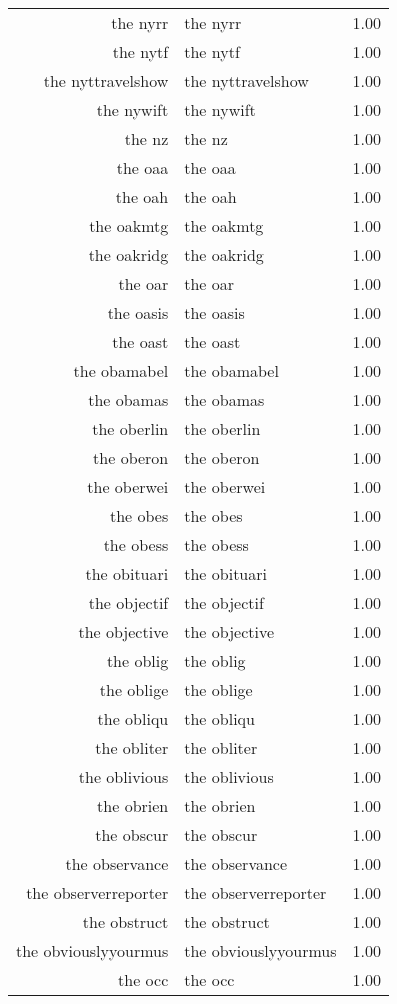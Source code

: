 \begin{table}[ht]
\begin{tabular}{rlr}
  the nyrr & the nyrr & 1.00 \\ 
  the nytf & the nytf & 1.00 \\ 
  the nyttravelshow & the nyttravelshow & 1.00 \\ 
  the nywift & the nywift & 1.00 \\ 
  the nz & the nz & 1.00 \\ 
  the oaa & the oaa & 1.00 \\ 
  the oah & the oah & 1.00 \\ 
  the oakmtg & the oakmtg & 1.00 \\ 
  the oakridg & the oakridg & 1.00 \\ 
  the oar & the oar & 1.00 \\ 
  the oasis & the oasis & 1.00 \\ 
  the oast & the oast & 1.00 \\ 
  the obamabel & the obamabel & 1.00 \\ 
  the obamas & the obamas & 1.00 \\ 
  the oberlin & the oberlin & 1.00 \\ 
  the oberon & the oberon & 1.00 \\ 
  the oberwei & the oberwei & 1.00 \\ 
  the obes & the obes & 1.00 \\ 
  the obess & the obess & 1.00 \\ 
  the obituari & the obituari & 1.00 \\ 
  the objectif & the objectif & 1.00 \\ 
  the objective & the objective & 1.00 \\ 
  the oblig & the oblig & 1.00 \\ 
  the oblige & the oblige & 1.00 \\ 
  the obliqu & the obliqu & 1.00 \\ 
  the obliter & the obliter & 1.00 \\ 
  the oblivious & the oblivious & 1.00 \\ 
  the obrien & the obrien & 1.00 \\ 
  the obscur & the obscur & 1.00 \\ 
  the observance & the observance & 1.00 \\ 
  the observerreporter & the observerreporter & 1.00 \\ 
  the obstruct & the obstruct & 1.00 \\ 
  the obviouslyyourmus & the obviouslyyourmus & 1.00 \\ 
  the occ & the occ & 1.00 \\ 

\end{tabular}
\end{table}
